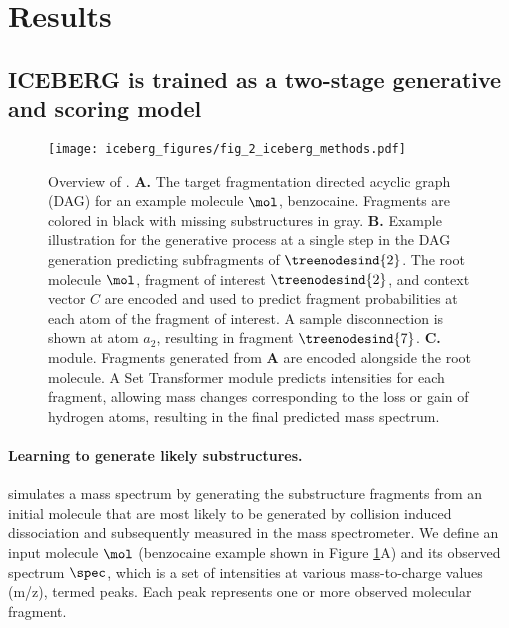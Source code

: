 \documentclass[journal=jcim,manuscript=article]{achemso}
\begin{document}
\section{Results}

\subsection{ICEBERG is trained as a two-stage generative and scoring model}
\label{sec:res_learning_gen}



\begin{figure}[t]
  \centering
  \texttt{[image: iceberg\_figures/fig\_2\_iceberg\_methods.pdf]}
  \caption{Overview of \ourModel. \textbf{A.} The target fragmentation directed acyclic graph (DAG) for an example molecule $\mol$, benzocaine. Fragments are colored in black with missing substructures in gray.
  \textbf{B.}  Example illustration for the generative process at a single step in the DAG generation predicting subfragments of $\treenodesind{2}$. The root molecule $\mol$, fragment of interest $\treenodesind{2}$, and context vector $C$ are encoded and used to predict fragment probabilities at each atom of the fragment of interest. A sample disconnection is shown at atom $a_2$, resulting in fragment $\treenodesind{7}$.  \textbf{C.}  \ourModel \ourModelTwoShort module. Fragments generated from \textbf{A} are encoded alongside the root molecule. A Set Transformer module predicts intensities for each fragment, allowing mass changes corresponding to the loss or gain of hydrogen atoms, resulting in the final predicted mass spectrum.}
  \label{fig:methods}
\end{figure}


\paragraph{Learning to generate likely substructures.} \ourModel simulates a mass spectrum by generating the substructure fragments from an initial molecule that are most likely to be generated by collision induced dissociation and subsequently measured in the mass spectrometer. We define an input molecule $\mol$ (benzocaine example shown in Figure \ref{fig:methods}A) and its observed spectrum $\spec$, which is a set of intensities at various mass-to-charge values (m/z), termed peaks. Each peak represents one or more observed molecular fragment. 
\end{document}
